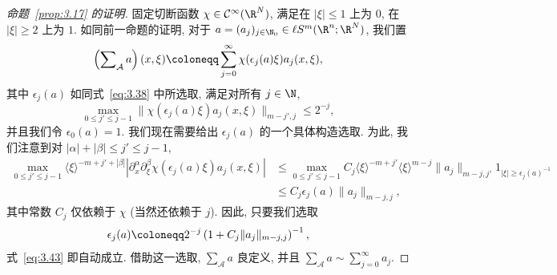 \begin{proof}[命题~\ref{prop:3.17} 的证明]
固定切断函数 $\chi \in \Smooth(\R^N)$, 满足在 $|\xi| \le 1$ 上为 $0$, 在 $|\xi| \ge 2$ 上为 $1$. 如同前一命题的证明, 对于 $a = (a_j)_{j \in \N_0} \in \ell S^m(\R^n; \R^N)$, 我们置
\begin{equation}\label{eq:3.42}
    \left( \sum\nolimits_{\mathcal{A}} a \right)(x, \xi) \defeq \sum_{j=0}^\infty \chi(\epsilon_j(a) \xi) a_j(x, \xi),
\end{equation}
其中 $\epsilon_j(a)$ 如同式~\eqref{eq:3.38} 中所选取, 满足对所有 $j \in \N$,
\begin{equation}\label{eq:3.43}
    \max_{0 \le j' \le j-1} \|\chi(\epsilon_j(a) \xi) a_j(x, \xi)\|_{m-j', j} \le 2^{-j},
\end{equation}
并且我们令 $\epsilon_0(a) = 1$. 我们现在需要给出 $\epsilon_j(a)$ 的一个具体构造选取. 为此, 我们注意到对 $|\alpha| + |\beta| \le j' \le j - 1$,
\begin{equation}\label{eq:3.44}
    \begin{aligned}
        \max_{0 \le j' \le j-1} \langle \xi \rangle^{-m+j'+|\beta|} |\partial_x^\alpha \partial_\xi^\beta \chi(\epsilon_j(a) \xi) a_j(x, \xi)|
        &\le \max_{0 \le j' \le j-1} C_j \langle \xi \rangle^{-m+j'} \langle \xi \rangle^{m-j} \|a_j\|_{m-j, j'} 1_{|\xi| \ge \epsilon_j(a)^{-1}} \\
        &\le C_j \epsilon_j(a) \|a_j\|_{m-j, j},
    \end{aligned}
\end{equation}
其中常数 $C_j$ 仅依赖于 $\chi$ (当然还依赖于 $j$). 因此, 只要我们选取
\begin{equation}\label{eq:3.45}
    \epsilon_j(a) \defeq 2^{-j} \left( 1 + C_j \|a_j\|_{m-j, j} \right)^{-1},
\end{equation}
式~\eqref{eq:3.43} 即自动成立. 借助这一选取, $\sum_{\mathcal{A}} a$ 良定义, 并且 $\sum_{\mathcal{A}} a \sim \sum_{j=0}^\infty a_j$.


\end{proof}
